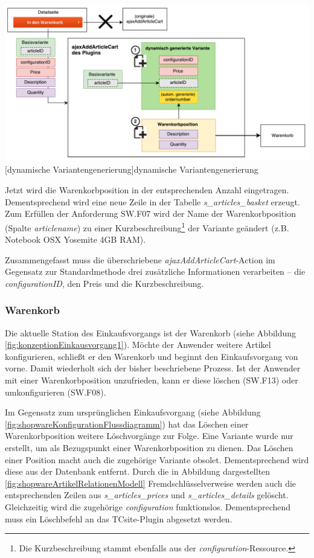 \documentclass[11pt, a4paper, titlepage, listof=totoc, bibliography=totoc, index=totoc, twoside, openright, headings=normal]{scrreprt}
\begin{document}
\vspace{1em}
\begin{minipage}{\linewidth}
	\centering
	\includegraphics[width=1\linewidth]{Abbildungen/dynamischeVariantengenerierung.pdf}
	[dynamische Variantengenerierung]{dynamische Variantengenerierung}
	\label{fig:dynamischeVariantengenerierung}
\end{minipage}
\vspace{0.3em}

Jetzt wird die Warenkorbposition in der entsprechenden Anzahl eingetragen. Dementsprechend wird eine neue Zeile in der Tabelle \emph{s\_articles\_basket} erzeugt. Zum Erfüllen der Anforderung SW.F07 wird der Name der Warenkorbposition (Spalte \emph{articlename}) zu einer Kurzbeschreibung\footnote{Die Kurzbeschreibung stammt ebenfalls aus der \emph{configuration}-Ressource.} der Variante geändert (z.B. \glqq Notebook OSX Yosemite 4GB RAM\grqq{}).

Zusammengefasst muss die überschriebene \emph{ajaxAddArticleCart}-Action im Gegensatz zur Standardmethode drei zusätzliche Informationen verarbeiten -- die \emph{configurationID}, den Preis und die Kurzbeschreibung.

\subsubsection*{Warenkorb}
Die aktuelle Station des Einkaufsvorgangs ist der Warenkorb (siehe Abbildung \ref{fig:konzeptionEinkausvorgang1}). Möchte der Anwender weitere Artikel konfigurieren, schließt er den Warenkorb und beginnt den Einkaufsvorgang von vorne. Damit wiederholt sich der bisher beschriebene Prozess. Ist der Anwender mit einer Warenkorbposition unzufrieden, kann er diese löschen (SW.F13) oder umkonfigurieren (SW.F08).

Im Gegensatz zum ursprünglichen Einkaufsvorgang (siehe Abbildung \ref{fig:shopwareKonfigurationFlussdiagramm}) hat das Löschen einer Warenkorbposition weitere Löschvorgänge zur Folge. Eine Variante wurde nur erstellt, um als Bezugspunkt einer Warenkorbposition zu dienen. Das Löschen einer Position macht auch die zugehörige Variante obsolet. Dementsprechend wird diese aus der Datenbank entfernt. Durch die in Abbildung dargestellten \ref{fig:shopwareArtikelRelationenModell} Fremdschlüsselverweise werden auch die entsprechenden Zeilen aus \emph{s\_articles\_prices} und \emph{s\_articles\_details}  gelöscht. Gleichzeitig wird die zugehörige \emph{configuration} funktionslos. Dementsprechend muss ein Löschbefehl an das TCsite-Plugin abgesetzt werden.
\end{document}
